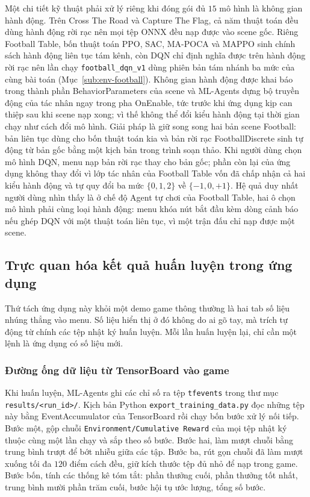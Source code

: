 \indent Một chi tiết kỹ thuật phải xử lý riêng khi đóng gói đủ $15$ mô hình là
không gian hành động. Trên Cross The Road và Capture The Flag, cả năm thuật
toán đều dùng hành động rời rạc nên mọi tệp ONNX đều nạp được vào scene gốc. Riêng
Football Table, bốn thuật toán PPO, SAC, MA-POCA và MAPPO sinh chính sách hành động
liên tục tám kênh, còn DQN chỉ định nghĩa được trên hành động rời rạc nên lần chạy
\texttt{football\_dqn\_v1} dùng phiên bản tám nhánh ba mức của cùng bài toán
(Mục~\ref{sub:env-football}). Không gian hành động được khai báo trong thành phần
BehaviorParameters của scene và ML-Agents dựng bộ truyền động của tác nhân
ngay trong pha OnEnable, tức trước khi ứng dụng kịp can thiệp sau khi scene
nạp xong; vì thế không thể đổi kiểu hành động tại thời gian chạy như cách đổi mô hình.
Giải pháp là giữ song song hai bản scene Football: bản liên tục dùng cho bốn thuật toán
kia và bản rời rạc FootballDiscrete sinh tự động từ bản gốc bằng một kịch bản
trong trình soạn thảo. Khi người dùng chọn mô hình DQN, menu nạp bản rời rạc thay cho
bản gốc; phần còn lại của ứng dụng không thay đổi vì lớp tác nhân của Football Table vốn đã
chấp nhận cả hai kiểu hành động và tự quy đổi ba mức $\{0,1,2\}$ về $\{-1,0,+1\}$. Hệ
quả duy nhất người dùng nhìn thấy là ở chế độ Agent tự chơi của Football Table,
hai ô chọn mô hình phải cùng loại hành động: menu khóa nút bắt đầu kèm dòng cảnh báo
nếu ghép DQN với một thuật toán liên tục, vì một trận đấu chỉ nạp được một scene.

\subsection{Trực quan hóa kết quả huấn luyện trong ứng dụng}
\label{sub:app-stats}

\indent Thứ tách ứng dụng này khỏi một demo game thông thường là hai tab số liệu nhúng
thẳng vào menu. Số liệu hiển thị ở đó không do ai gõ tay, mà trích tự động từ chính các
tệp nhật ký huấn luyện. Mỗi lần huấn luyện lại, chỉ cần một lệnh là ứng dụng có số liệu
mới.

\subsubsection{Đường ống dữ liệu từ TensorBoard vào game}

\indent Khi huấn luyện, ML-Agents ghi các chỉ số ra tệp \texttt{tfevents} trong thư mục
\texttt{results/<run\_id>/}. Kịch bản Python \texttt{export\_training\_data.py} đọc những
tệp này bằng EventAccumulator của TensorBoard rồi chạy bốn bước xử lý nối tiếp.
Bước một, gộp chuỗi \texttt{Environment/Cumulative Reward} của mọi tệp nhật ký thuộc cùng
một lần chạy và sắp theo số bước. Bước hai, làm mượt chuỗi bằng trung bình trượt để bớt
nhiễu giữa các tập. Bước ba, rút gọn chuỗi đã làm mượt xuống tối đa $120$ điểm cách đều, giữ
kích thước tệp đủ nhỏ để nạp trong game. Bước bốn, tính các thống kê tóm tắt: phần thưởng
cuối, phần thưởng tốt nhất, trung bình mười phần trăm cuối, bước hội tụ ước
lượng, tổng số bước.

